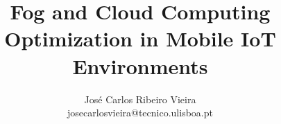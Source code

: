 \documentclass{llncs}
\begin{document}
\mainmatter              %
\title{Fog and Cloud Computing Optimization in Mobile IoT Environments}
\author{
	José Carlos Ribeiro Vieira\\
	josecarlosvieira@tecnico.ulisboa.pt \\
}


{\def\addcontentsline#1#2#3{}\maketitle} %

\begin{abstract}

\end{abstract}

\setcounter{tocdepth}{2} 
\tableofcontents

\vfill
\pagebreak











\end{document}
